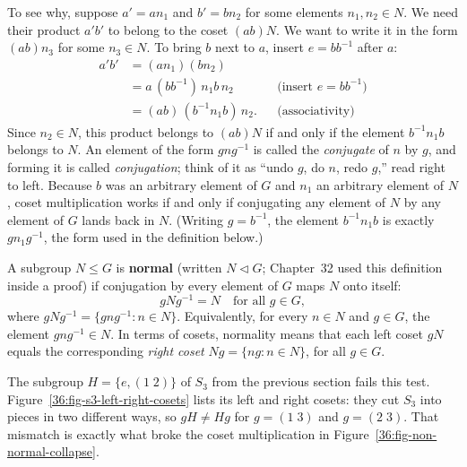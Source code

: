 To see why, suppose $a' = an_1$ and $b' = bn_2$ for some elements $n_1, n_2 \in N$. We need their product $a'b'$ to belong to the coset $(ab)N$. We want to write it in the form $(ab)n_3$ for some $n_3 \in N$. To bring $b$ next to $a$, insert $e = bb^{-1}$ after $a$:
\begin{align*}
a'b' &= (an_1)(bn_2)\\
&= a\,(bb^{-1})\,n_1 b\, n_2 && \text{(insert } e = bb^{-1}\text{)}\\
&= (ab)\,(b^{-1}n_1b)\,n_2. && \text{(associativity)}
\end{align*}
Since $n_2 \in N$, this product belongs to $(ab)N$ if and only if the element $b^{-1}n_1b$ belongs to $N$. An element of the form $gng^{-1}$ is called the \emph{conjugate} of $n$ by $g$, and forming it is called \emph{conjugation}; think of it as ``undo $g$, do $n$, redo $g$,'' read right to left. Because $b$ was an arbitrary element of $G$ and $n_1$ an arbitrary element of $N$, coset multiplication works if and only if conjugating any element of $N$ by any element of $G$ lands back in $N$. (Writing $g = b^{-1}$, the element $b^{-1}n_1b$ is exactly $gn_1g^{-1}$, the form used in the definition below.)

\begin{formalbox}
A subgroup $N \le G$ is \textbf{normal} (written $N \triangleleft G$; Chapter~32 used this definition inside a proof) if conjugation by every element of $G$ maps $N$ onto itself:
\[
gNg^{-1} = N \quad \text{for all } g \in G,
\]
where $gNg^{-1} = \{gng^{-1} : n \in N\}$.
Equivalently, for every $n \in N$ and $g \in G$, the element $gng^{-1} \in N$. In terms of cosets, normality means that each left coset $gN$ equals the corresponding \emph{right coset} $Ng = \{ng : n \in N\}$, for all $g \in G$.
\end{formalbox}

The subgroup $H = \{e, (1\;2)\}$ of $S_3$ from the previous section fails this test. Figure~\ref{36:fig-s3-left-right-cosets} lists its left and right cosets: they cut $S_3$ into pieces in two different ways, so $gH \neq Hg$ for $g = (1\;3)$ and $g = (2\;3)$. That mismatch is exactly what broke the coset multiplication in Figure~\ref{36:fig-non-normal-collapse}.

